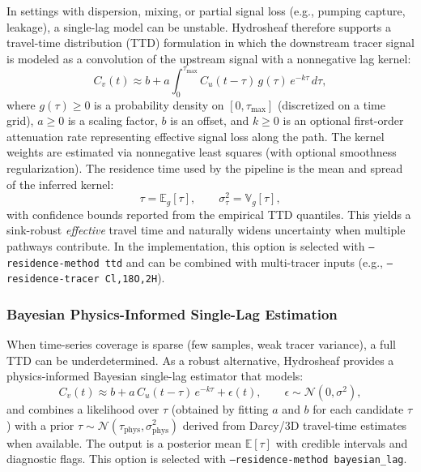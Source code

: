 \documentclass[12pt,a4paper]{article}
\theoremstyle{plain}
\theoremstyle{definition}
\theoremstyle{remark}
\begin{document}
In settings with dispersion, mixing, or partial signal loss (e.g., pumping capture, leakage), a single-lag model can be unstable. Hydrosheaf therefore supports a travel-time distribution (TTD) formulation in which the downstream tracer signal is modeled as a convolution of the upstream signal with a nonnegative lag kernel:
\begin{equation}
	C_v(t) \approx b + a \int_{0}^{\tau_{\max}} C_u(t-\tau)\, g(\tau)\, e^{-k\tau}\, d\tau,
\end{equation}
where $g(\tau)\ge 0$ is a probability density on $[0,\tau_{\max}]$ (discretized on a time grid), $a\ge 0$ is a scaling factor, $b$ is an offset, and $k\ge 0$ is an optional first-order attenuation rate representing effective signal loss along the path. The kernel weights are estimated via nonnegative least squares (with optional smoothness regularization). The residence time used by the pipeline is the mean and spread of the inferred kernel:
\begin{equation}
	\tau = \mathbb{E}_g[\tau], \qquad \sigma_\tau^2 = \mathbb{V}_g[\tau],
\end{equation}
with confidence bounds reported from the empirical TTD quantiles. This yields a sink-robust \textit{effective} travel time and naturally widens uncertainty when multiple pathways contribute.
In the implementation, this option is selected with \texttt{--residence-method ttd} and can be combined with multi-tracer inputs (e.g., \texttt{--residence-tracer Cl,18O,2H}).

\subsubsection{Bayesian Physics-Informed Single-Lag Estimation}

When time-series coverage is sparse (few samples, weak tracer variance), a full TTD can be underdetermined. As a robust alternative, Hydrosheaf provides a physics-informed Bayesian single-lag estimator that models:
\begin{equation}
	C_v(t) \approx b + a\, C_u(t-\tau)\, e^{-k\tau} + \epsilon(t), \qquad \epsilon \sim \mathcal{N}(0,\sigma^2),
\end{equation}
and combines a likelihood over $\tau$ (obtained by fitting $a$ and $b$ for each candidate $\tau$) with a prior $\tau \sim \mathcal{N}(\tau_{\text{phys}}, \sigma_{\text{phys}}^2)$ derived from Darcy/3D travel-time estimates when available. The output is a posterior mean $\mathbb{E}[\tau]$ with credible intervals and diagnostic flags. This option is selected with \texttt{--residence-method bayesian\_lag}.
\end{document}
